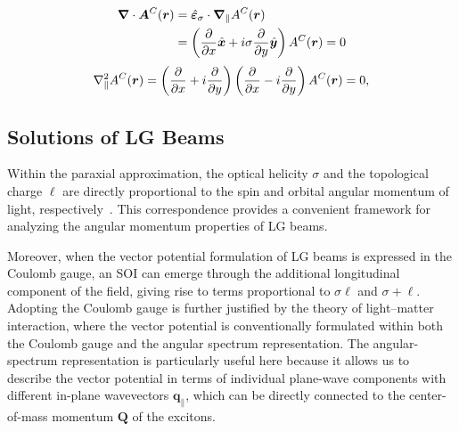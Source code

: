 \begin{align} 
\color{G} 
\boldsymbol{\nabla} \cdot \boldsymbol{A}^C(\boldsymbol{r})
&=
\hat{\boldsymbol{\varepsilon}}_{\sigma} \cdot \boldsymbol{\nabla}_\parallel A^C(\boldsymbol{r}) \\
&=
\left( \frac{\partial}{\partial x}\hat{\boldsymbol{x}} + i \sigma \frac{\partial}{\partial y}\hat{\boldsymbol{y}} \right)A^C(\boldsymbol{r}) = 0
\label{Vio}
\end{align}
\begin{equation}
\color{G}
\nabla^2_\parallel A^C(\boldsymbol{r})
=
\left( \frac{\partial}{\partial x} + i \frac{\partial}{\partial y} \right)
\left( \frac{\partial}{\partial x} - i \frac{\partial}{\partial y} \right)
A^C(\boldsymbol{r})
= 0,
\end{equation}
%
%
%
%
%
%
\subsection{Solutions of LG Beams}
Within the paraxial approximation, the optical helicity $\sigma$ and the topological charge $\ell$ are directly proportional to the spin and orbital angular momentum of light, respectively~\cite{bliokh2015transverse, barnett1994orbital}. This correspondence provides a convenient framework for analyzing the angular momentum properties of LG beams. 

Moreover, when the vector potential formulation of LG beams is expressed in the Coulomb gauge, an SOI can emerge through the additional longitudinal component of the field, giving rise to terms proportional to $\sigma \ell$ and $\sigma + \ell$. Adopting the Coulomb gauge is further justified by the theory of light–matter interaction, where the vector potential is conventionally formulated within both the Coulomb gauge and the angular spectrum representation. The angular-spectrum representation is particularly useful here because it allows us to describe the vector potential in terms of individual plane-wave components with different in-plane wavevectors $\boldsymbol q_\parallel$, which can be directly connected to the center-of-mass momentum $\boldsymbol Q$ of the excitons.

